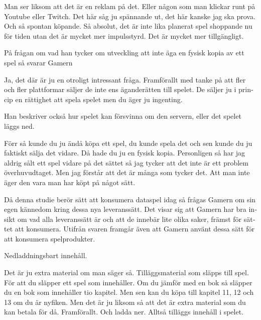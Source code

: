 \documentclass[11p]{article}
\begin{document}
\begin{otherlanguage}{swedish}
        \setlength{\leftskip}{1cm}
        Man ser liksom att det är en reklam på det. Eller någon som man klickar runt på  Youtube eller Twitch. Det här såg ju spännande ut, det här kanske jag ska prova. Och så spontan köpande.
        Så absolut, det är inte lika planerat spel shoppande nu för tiden utan det är mycket mer impulsstyrd. Det är mycket mer tillgängligt.



        \setlength{\leftskip}{0cm}
        På frågan om vad han tycker om utveckling att inte äga en fysisk kopia av ett spel så svarar Gamern

        \setlength{\leftskip}{1cm}
        Ja, det där är ju en otroligt intressant fråga.
        Framförallt med tanke på att fler och fler plattformar säljer de inte ens äganderätten till spelet.
        De säljer ju i princip en rättighet att spela spelet men du äger ju ingenting.



        \setlength{\leftskip}{0cm}
        Han beskriver också hur spelet kan försvinna om den servern, eller det spelet läggs ned.

        \setlength{\leftskip}{1cm}
        Förr så kunde du ju ändå köpa ett spel, du kunde spela det och sen kunde du ju faktiskt sälja det vidare. Då hade du ju en fysisk kopia. Personligen så har jag aldrig sålt ett spel vidare på det sättet så jag tycker att det inte är ett problem överhuvudtaget. Men jag förstår att det är många som tycker det. Att man inte äger den vara man har köpt på något sätt.


        \setlength{\leftskip}{0cm}
        Då denna studie berör sätt att konsumera dataspel idag så frågas Gamern om sin egen kännedom kring dessa nya leveranssätt. Det visar sig att Gamern har bra insikt om vad alla leveranssätt är och att de innebär lite olika saker, främst för sättet att konsumera. Utifrån svaren framgår även att Gamern använt dessa sätt för att konsumera spelprodukter.

        Nedladdningsbart innehåll.

        \setlength{\leftskip}{1cm}
        Det är ju extra material om man säger så. Tilläggsmaterial som släpps till spel. För att du släpper ett spel som innehåller. Om du jämför med en bok så släpper du en bok som innehåller tio kapitel. Men sen kan du köpa till kapitel 11, 12 och 13 om du är nyfiken. Men det är ju liksom så att det är extra material som du kan betala för då. Framförallt. Och ladda ner. Alltså tilläggs innehåll i spelet.




\end{otherlanguage}
\end{document}
